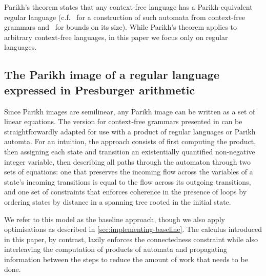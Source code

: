 Parikh's theorem states that any context-free language has a Parikh-equivalent
regular language (c.f.~\cite{construction} for a construction of such automata
from context-free grammars and~\cite{bounds} for bounds on its size).
%
While Parikh's theorem applies to arbitrary context-free languages, in this
paper we focus only on regular languages.

\subsection{The Parikh image of a regular language expressed in Presburger arithmetic}
\label{sec:verma}

Since Parikh images are semilinear, any Parikh image can be written as a set of
linear equations. The version for context-free grammars presented in
\cite{generate-parikh-image} can be straightforwardly adapted for use with a
product of regular languages or Parikh automta. For an intuition, the approach
consists of first computing the product, then assigning each state and
transition an existentially quantified non-negative integer variable, then
describing all paths through the automaton through two sets of equations: one
that preserves the incoming flow across the variables of a state's incoming
transitions is equal to the flow across its outgoing transitions, and one set of
constraints that enforces coherence in the presence of loops by ordering states
by distance in a spanning tree rooted in the initial state.

We refer to this model as the baseline approach, though we also apply
optimisations as described in \cref{sec:implementing-baseline}. The calculus
introduced in this paper, by contrast, lazily enforces the connectedness
constraint while also interleaving the computation of products of automata and
propagating information between the steps to reduce the amount of work that
needs to be done.